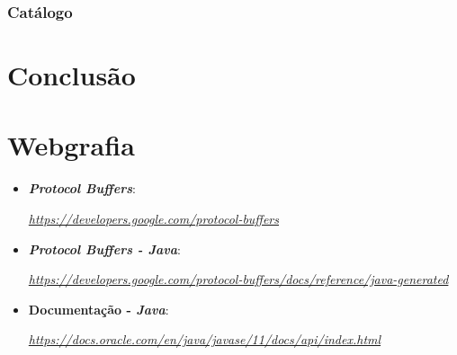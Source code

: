 \documentclass[a4paper]{report}
\begin{document}
	\subsection{Catálogo}


\chapter{Conclusão}

\chapter{Webgrafia}
	\begin{itemize}
		\item \textbf{\textit{Protocol Buffers}}:
		\par \textit{\url{https://developers.google.com/protocol-buffers}}
        \item \textbf{\textit{Protocol Buffers - Java}}:
		\par \textit{\url{https://developers.google.com/protocol-buffers/docs/reference/java-generated}}
		\item \textbf{Documentação - \textit{Java}}:
		\par \textit{\url{https://docs.oracle.com/en/java/javase/11/docs/api/index.html}}
    \end{itemize}
\end{document}
